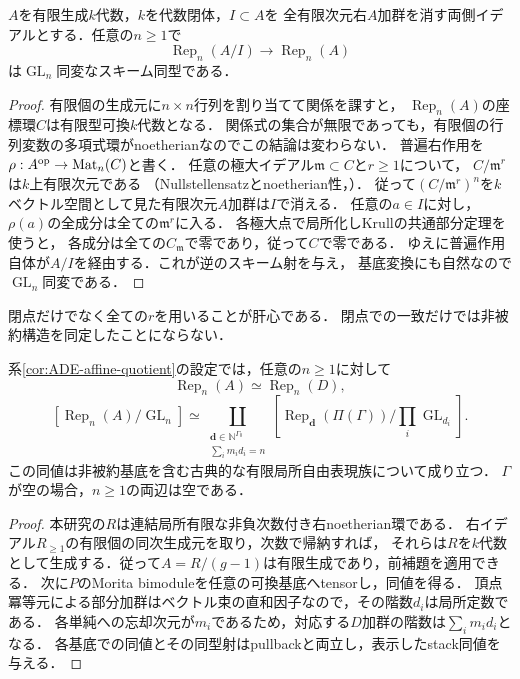 \begin{lemma}[全有限次元表現のkernelと表現スキーム]\label{lem:universal-rep-scheme}
$A$を有限生成$k$代数，$k$を代数閉体，$I\subset A$を
全有限次元右$A$加群を消す両側イデアルとする．任意の$n\ge1$で
\[
 \operatorname{Rep}_n(A/I)\longrightarrow\operatorname{Rep}_n(A)
\]
は$\operatorname{GL}_n$同変なスキーム同型である．
\end{lemma}
\begin{proof}
有限個の生成元に$n\times n$行列を割り当てて関係を課すと，
$\operatorname{Rep}_n(A)$の座標環$C$は有限型可換$k$代数となる．
関係式の集合が無限であっても，有限個の行列変数の多項式環がnoetherianなのでこの結論は変わらない．
普遍右作用を$\rho:A^{\rm op}\to\operatorname{Mat}_n(C)$と書く．
任意の極大イデアル$\mathfrak m\subset C$と$r\ge1$について，
$C/\mathfrak m^r$は$k$上有限次元である
（Nullstellensatzとnoetherian性，\cite[Tag 00FV]{Stacks}）．
従って$(C/\mathfrak m^r)^n$を$k$ベクトル空間として見た有限次元$A$加群は$I$で消える．
任意の$a\in I$に対し，$\rho(a)$の全成分は全ての$\mathfrak m^r$に入る．
各極大点で局所化しKrullの共通部分定理\cite[Tag 00IP]{Stacks}を使うと，
各成分は全ての$C_{\mathfrak m}$で零であり，従って$C$で零である．
ゆえに普遍作用自体が$A/I$を経由する．これが逆のスキーム射を与え，
基底変換にも自然なので$\operatorname{GL}_n$同変である．
\end{proof}
閉点だけでなく全ての$r$を用いることが肝心である．
閉点での一致だけでは非被約構造を同定したことにならない．

\begin{theorem}[固定曲面の有限次元表現stack]\label{thm:finite-rep-stack}
系\ref{cor:ADE-affine-quotient}の設定では，任意の$n\ge1$に対して
\[
 \operatorname{Rep}_n(A)\simeq\operatorname{Rep}_n(D),
\]
\[
 [\operatorname{Rep}_n(A)/\operatorname{GL}_n]
 \simeq
 \coprod_{\substack{\mathbf d\in\mathbb N^{\Gamma_0}\\
                    \sum_i m_id_i=n}}
 [\operatorname{Rep}_{\mathbf d}(\Pi(\Gamma))/
                \prod_i\operatorname{GL}_{d_i}].
\]
この同値は非被約基底を含む古典的な有限局所自由表現族について成り立つ．
$\Gamma$が空の場合，$n\ge1$の両辺は空である．
\end{theorem}
\begin{proof}
本研究の$R$は連結局所有限な非負次数付き右noetherian環である．
右イデアル$R_{\ge1}$の有限個の同次生成元を取り，次数で帰納すれば，
それらは$R$を$k$代数として生成する．従って$A=R/(g-1)$は有限生成であり，前補題を適用できる．
次に$P$のMorita bimoduleを任意の可換基底へtensorし，同値を得る．
頂点冪等元による部分加群はベクトル束の直和因子なので，その階数$d_i$は局所定数である．
各単純への忘却次元が$m_i$であるため，対応する$D$加群の階数は$\sum_i m_id_i$となる．
各基底での同値とその同型射はpullbackと両立し，表示したstack同値を与える．
\end{proof}

